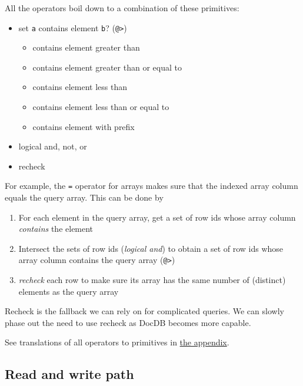 \documentclass[11pt]{article}
\providecommand{\tightlist}{%
  \setlength{\itemsep}{0pt}\setlength{\parskip}{0pt}}
\begin{document}
All the operators boil down to a combination of these primitives:

\begin{itemize}
\tightlist
\item
  set \texttt{a} contains element \texttt{b}? (\texttt{@\textgreater{}})

  \begin{itemize}
  \tightlist
  \item
    contains element greater than
  \item
    contains element greater than or equal to
  \item
    contains element less than
  \item
    contains element less than or equal to
  \item
    contains element with prefix
  \end{itemize}
\item
  logical and, not, or
\item
  recheck
\end{itemize}

For example, the \texttt{=} operator for arrays makes sure that the
indexed array column equals the query array. This can be done by

\begin{enumerate}
\def\labelenumi{\arabic{enumi}.}
\tightlist
\item
  For each element in the query array, get a set of row ids whose array
  column \emph{contains} the element
\item
  Intersect the sets of row ids (\emph{logical and}) to obtain a set of
  row ids whose array column contains the query array
  (\texttt{@\textgreater{}})
\item
  \emph{recheck} each row to make sure its array has the same number of
  (distinct) elements as the query array
\end{enumerate}

Recheck is the fallback we can rely on for complicated queries. We can
slowly phase out the need to use recheck as DocDB becomes more capable.

See translations of all operators to primitives in
\protect\hyperlink{operators-to-primitives}{the appendix}.

\hypertarget{read-and-write-path}{%
\subsection{Read and write path}\label{read-and-write-path}}
\end{document}
